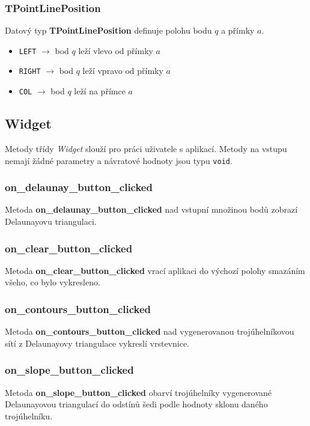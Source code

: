 \documentclass[a4paper, 12pt]{article}
\begin{document}
\subsubsection*{TPointLinePosition}
Datový typ \textbf{TPointLinePosition} definuje polohu bodu $q$ a přímky $a$.\\   
\begin{itemize}
\item \texttt{LEFT} $\rightarrow$ bod $q$ leží vlevo od přímky $a$
\item \texttt{RIGHT} $\rightarrow$ bod $q$ leží vpravo od přímky $a$
\item \texttt{COL} $\rightarrow$ bod $q$ leží na přímce $a$
\end{itemize}




\subsection{Widget}
Metody třídy \textit{Widget} slouží pro práci uživatele s aplikací. Metody na vstupu nemají žádné parametry a návratové hodnoty jsou typu \texttt{void}.

\subsubsection*{on\_delaunay\_button\_clicked}
Metoda \textbf{on\_delaunay\_button\_clicked} nad vstupní množinou bodů zobrazí Delaunayovu triangulaci. 

\subsubsection*{on\_clear\_button\_clicked}
Metoda \textbf{on\_clear\_button\_clicked} vrací aplikaci do výchozí polohy smazáním všeho, co bylo vykresleno. 

\subsubsection*{on\_contours\_button\_clicked}
Metoda \textbf{on\_contours\_button\_clicked} nad vygenerovanou trojúhelníkovou sítí z Delaunayovy triangulace vykreslí vrstevnice. 

\subsubsection*{on\_slope\_button\_clicked}
Metoda \textbf{on\_slope\_button\_clicked} obarví trojúhelníky vygenerované Delaunayovou triangulací do odstínů šedi podle hodnoty sklonu daného trojúhelníku.
\end{document}
